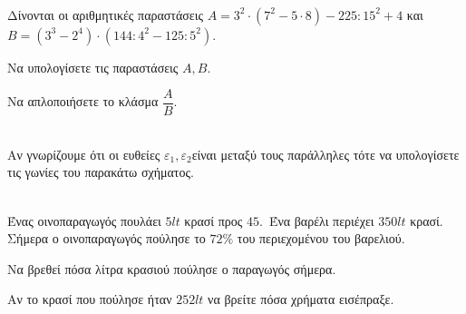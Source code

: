 \documentclass[ektypwsh]{diag-xelatex}
\begin{document}
\newpage
\noindent
\askhseis
\begin{thema}
\item \mbox{}\\
Δίνονται οι αριθμητικές παραστάσεις $ A=3^2\cdot\left(7^2-5\cdot8 \right)-225:15^2+4 $ και $ B=\left(3^3-2^4\right)\cdot\left(144:4^2-125:5^2\right) $.
\begin{rlist}
\item Να υπολογίσετε τις παραστάσεις $ A,B $.
\item Να απλοποιήσετε το κλάσμα $ \dfrac{A}{B} $.
\end{rlist}
\item \mbox{}\\
Αν γνωρίζουμε ότι οι ευθείες $ \varepsilon_1,\varepsilon_2 $είναι μεταξύ τους παράλληλες τότε να υπολογίσετε τις γωνίες του παρακάτω σχήματος.
\begin{center}
\end{center}
\item \mbox{}\\
Ένας οινοπαραγωγός πουλάει $ 5lt $ κρασί προς $ 45$\officialeuro .\ Ένα βαρέλι περιέχει $ 350lt $ κρασί. Σήμερα ο οινοπαραγωγός πούλησε το $ 72\% $ του περιεχομένου του βαρελιού.
\begin{rlist}
\item Να βρεθεί πόσα λίτρα κρασιού πούλησε ο παραγωγός σήμερα.
\item Αν το κρασί που πούλησε ήταν $ 252lt $ να βρείτε πόσα χρήματα εισέπραξε.
\end{rlist}
\end{thema}
\end{document}

